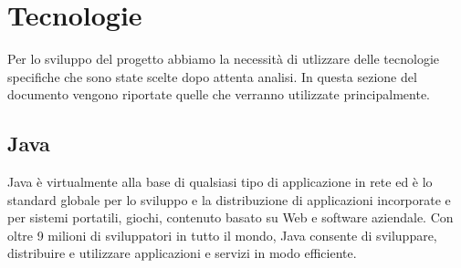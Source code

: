 \section{Tecnologie}
\label{tecnologie}
Per lo sviluppo del progetto abbiamo la necessità di utlizzare delle tecnologie specifiche che sono state scelte dopo attenta analisi.
In questa sezione del documento vengono riportate quelle che verranno utilizzate principalmente.

\subsection{Java}

	Java è virtualmente alla base di qualsiasi tipo di applicazione in rete ed è lo standard globale per lo sviluppo e la distribuzione di applicazioni incorporate e per sistemi portatili, giochi, contenuto basato su Web e software aziendale. Con oltre 9 milioni di sviluppatori in tutto il mondo, Java consente di sviluppare, distribuire e utilizzare applicazioni e servizi in modo efficiente. \\

